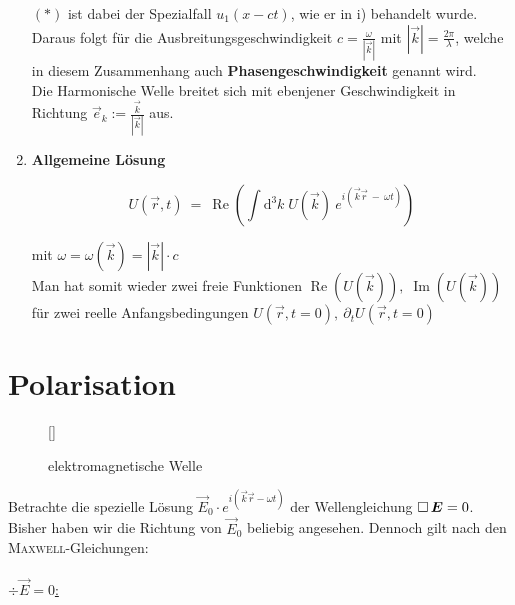 \begin{enumerate}
$(*)$ ist dabei der Spezialfall $u_1(x-ct)$, wie er in i) behandelt wurde.\\
Daraus folgt für die Ausbreitungsgeschwindigkeit $c =\frac{\omega}{|\vec{k}|}$ mit $|\vec{k}|=\frac{2\pi}{\lambda}$, welche in diesem Zusammenhang auch \textbf{Phasengeschwindigkeit} genannt wird.\\
Die Harmonische Welle breitet sich mit ebenjener Geschwindigkeit in Richtung $\vec{e}_k := \frac{\vec{k}}{|\vec{k}|}$ aus.

\item \textbf{Allgemeine Lösung}

\begin{equation*}
U(\vec{r},t) \ = \ \operatorname{Re} \left(\int\mathrm{d}^3 k \; U(\vec{k}) \ e^{i(\vec{k}\vec{r} \ - \ \omega t)}\right)
\end{equation*}

mit $\omega = \omega(\vec{k}) = |\vec{k}| \cdot c$\\
Man hat somit wieder zwei freie Funktionen $\operatorname{Re}(U(\vec{k})),\; \operatorname{Im}(U(\vec{k}))$ für zwei reelle Anfangsbedingungen $U(\vec{r},t=0),\ \partial_t U(\vec{r},t=0)$

\end{enumerate}


\section{Polarisation}
\begin{wrapfigure}[]{r}[0cm]{0cm}
	\raisebox{0pt}[\dimexpr{}\baselineskip\relax]{
		\colorbox{hgrey}{
		}
	}
	\caption{elektromagnetische Welle}
\end{wrapfigure}
Betrachte die spezielle Lösung $\vec{E}_0 \cdot e^{i(\vec{k}\vec{r} - \omega t)}$ der Wellengleichung $\mathop{{}\Box}\nolimits \bm{E} = 0$. Bisher haben wir die Richtung von $\vec{E}_0$ beliebig angesehen. Dennoch gilt nach den \textsc{Maxwell}-Gleichungen:\
\\
\ \\ \linebreak\linebreak\linebreak\linebreak
\underline{$\div\vec{E} = 0$:}


